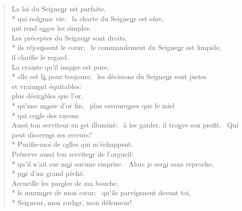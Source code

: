 \begin{verse}
La loi du Seigne\underline{u}r est parfaite, \\*
qui red\underline{o}nne vie;~\psalmstar
la charte du Seigne\underline{u}r est sûre, \\
qui rend s\underline{a}ges les simples. \\

Les préceptes du Seigne\underline{u}r sont droits, \\*
ils réjou\underline{i}ssent le cœur;~\psalmstar
le commandement du Seigne\underline{u}r est limpide, \\
il clarif\underline{i}e le regard. \\

La crainte qu’il insp\underline{i}re est pure, \\*
elle est l\underline{à} pour toujours;~\psalmstar
les décisions du Seigne\underline{u}r sont justes \\
et vraim\underline{e}nt équitables: \\

plus désir\underline{a}bles que l’or, \\*
qu’une m\underline{a}sse d’or fin,~\psalmstar
plus savoure\underline{u}ses que le miel \\*
qui co\underline{u}le des rayons. \\

Aussi ton serviteur en \underline{e}st illuminé;~\psalmdagger
à les garder, il tro\underline{u}ve son profit.~\psalmstar
{}Qui peut discern\underline{e}r ses erreurs? \\*
Purifie-moi de c\underline{e}lles qui m’échappent. \\

Préserve aussi ton servite\underline{u}r de l’orgueil: \\*
qu’il n’ait sur m\underline{o}i aucune emprise.~\psalmstar
Alors je ser\underline{a}i sans reproche, \\*
p\underline{u}r d’un grand péché. \\

Accueille les par\underline{o}les de ma bouche, \\*
le murm\underline{u}re de mon cœur;~\psalmstar
qu’ils parvi\underline{e}nnent devant toi, \\*
Seigneur, mon roch\underline{e}r, mon défenseur! \\
\end{verse}

